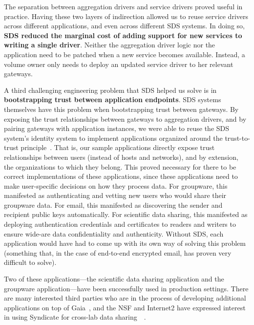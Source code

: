 The separation between aggregation drivers and service drivers proved useful in
practice.  Having these two layers of indirection allowed us to reuse service
drivers across different applications, and even across different SDS systems.
In doing so, \textbf{SDS reduced the marginal cost of adding support for new
services to writing a single driver}.
Neither the aggregation driver logic nor the application need to be
patched when a new service becomes available.  Instead, a volume owner only
needs to deploy an updated service driver to her relevant gateways.

A third challenging engineering problem that SDS helped us solve is in
\textbf{bootstrapping trust between application endpoints}.  SDS systems
themselves have this problem when bootstrapping trust between gateways.  By
exposing the trust relationships between gateways to aggregation drivers,
and by pairing gateways with application instances, we were able to reuse the
SDS system's identity system to implement applications organized around the
trust-to-trust principle~\cite{trust-to-trust}.  That is, our sample
applications directly expose trust relationships between users (instead of hosts
and networks), and by extension, the organizations to which they belong.  This
proved necessary for there to be correct implementations of these applications,
since these applications need to make user-specific decisions on how they
process data.  For 
groupware, this manifested as authenticating and vetting new users who would
share their groupware data.  For email, this manifested as discovering the
sender and recipient public keys automatically.  For scientific data sharing,
this manifested as deploying authentication credentials and certificates to
readers and writers to ensure wide-are data confidentiality and authenticity.
Without SDS, each application would have had to come up with its own way of
solving this problem (something that, in the case of end-to-end encrypted
email, has proven very difficult to solve).

Two of these applications---the scientific data sharing application and the
groupware application---have been successfully used in production settings.
There are many interested third parties who are in the process of developing
additional applications on top of Gaia~\cite{blockstack-app-fund}, and the NSF
and Internet2 have expressed interest in using Syndicate for cross-lab data
sharing~\cite{nsf-grant}~\cite{conversation-internet2}.
